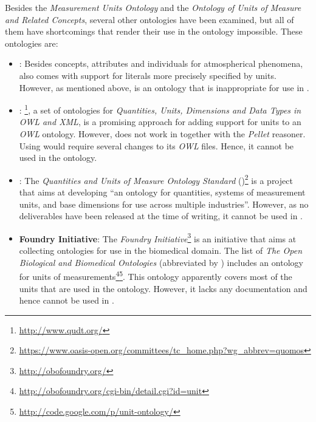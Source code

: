 Besides the \emph{Measurement Units Ontology} and the \emph{Ontology of Units of Measure and Related Concepts}, several other ontologies have been examined, but all of them have shortcomings that render their use in the \thinkhomeweather ontology impossible. These ontologies are:

\begin{itemize}
  \item \textbf{}: Besides concepts, attributes and individuals for atmospherical phenomena,  also comes with support for literals more precisely specified by units. However, as mentioned above,  is an ontology that is inappropriate for use in \thinkhomeweather.
  
  \item \textbf{}: \footnote{\href{http://www.qudt.org/}{http://www.qudt.org/}}, a set of ontologies for \emph{Quantities, Units, Dimensions and Data Types in OWL and XML}, is a promising approach for adding support for units to an \emph{OWL} ontology. However,  does not work in \protege together with the \emph{Pellet} reasoner. Using  would require several changes to its \emph{OWL} files. Hence, it cannot be used in the \thinkhomeweather ontology.
  
  \item \textbf{}: The \emph{ Quantities and Units of Measure Ontology Standard} ()\footnote{\href{https://www.oasis-open.org/committees/tc\_home.php?wg\_abbrev=quomos}{https://www.oasis-open.org/committees/tc\_home.php?wg\_abbrev=quomos}} is a project that aims at developing ``an ontology for quantities, systems of measurement units, and base dimensions for use across multiple industries''. However, as no deliverables have been released at the time of writing, it cannot be used in \thinkhomeweather.
  
  \item \textbf{ Foundry Initiative}: The \emph{ Foundry Initiative}\footnote{\href{http://obofoundry.org/}{http://obofoundry.org/}} is an initiative that aims at collecting ontologies for use in the biomedical domain. The list of \emph{The Open Biological and Biomedical Ontologies} (abbreviated by ) includes an ontology for units of measurements\footnote{\href{http://obofoundry.org/cgi-bin/detail.cgi?id=unit}{http://obofoundry.org/cgi-bin/detail.cgi?id=unit}}\footnote{\href{http://code.google.com/p/unit-ontology/}{http://code.google.com/p/unit-ontology/}}. This ontology apparently covers most of the units that are used in the \thinkhomeweather ontology. However, it lacks any documentation and hence cannot be used in \thinkhomeweather.
\end{itemize}

